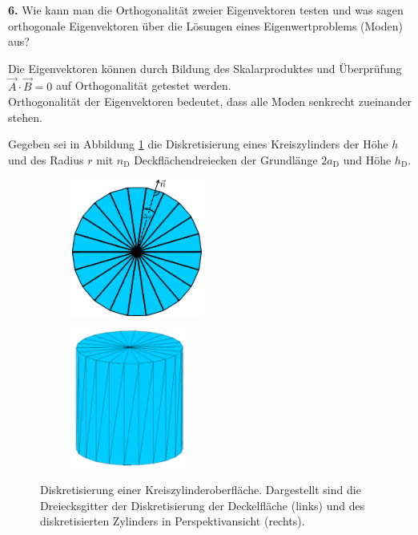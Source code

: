 \documentclass[Protokollheft.tex]{subfiles}
\begin{document}
	
	
	
	\begin{framed}
		\noindent \textbf{6.} Wie kann man die Orthogonalität zweier Eigenvektoren testen und was sagen orthogonale Eigenvektoren über die Lösungen eines Eigenwertproblems (Moden) aus?\label{exer:orthogonalEV}
	\end{framed}
	\noindent
	Die Eigenvektoren können durch Bildung des Skalarproduktes und Überprüfung $\vec{A} \cdot \vec{B} = 0$ auf Orthogonalität getestet werden. \\
	Orthogonalität der Eigenvektoren bedeutet, dass alle Moden senkrecht zueinander stehen.
	
	
	\noindent Gegeben sei in Abbildung \ref{fig:zylGitter} die Diskretisierung eines Kreiszylinders der Höhe $h$ und des Radius $r$ mit $n_\mathrm{D}$ Deckflächendreiecken der Grundlänge $2a_\text{D}$ und Höhe $h_\text{D}$.\\
	\begin{figure}[h]
		\centering
		\begin{subfigure}{0.49\textwidth}
			\centering
			\includegraphics[height=4.5cm]{v1_zylinder1.pdf}
		\end{subfigure}
		\begin{subfigure}{0.49\textwidth}
			\centering
			\includegraphics[height=4.5cm]{v1_zylinder2.pdf}
		\end{subfigure}
		\caption{Diskretisierung einer Kreiszylinderoberfläche. Dargestellt sind die Dreiecksgitter der Diskretisierung der Deckelfläche (links) und des diskretisierten Zylinders in Perspektivansicht (rechts).}\label{fig:zylGitter}
	\end{figure}
	
\end{document}
